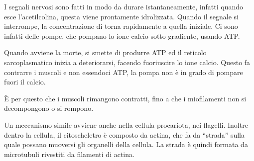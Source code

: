 I segnali nervosi sono fatti in modo da durare istantaneamente, infatti quando esce l'acetilcolina, questa viene prontamente idrolizzata. Quando il segnale si interrompe, la concentrazione di  torna rapidamente a quella iniziale. Ci sono infatti delle pompe, che pompano lo ione calcio sotto gradiente, usando ATP.{}

Quando avviene la morte, si smette di produrre ATP ed il reticolo sarcoplasmatico inizia a deteriorarsi, facendo fuoriuscire lo ione calcio. Questo fa contrarre i muscoli e non essendoci ATP, la pompa non è in grado di pompare fuori il calcio.

È per questo che i muscoli rimangono contratti, fino a che i miofilamenti non si decompongono o si rompono.

Un meccanismo simile avviene anche nella cellula procariota, nei flagelli. Inoltre dentro la cellula, il citoscheletro è composto da actina, che fa da ``strada'' sulla quale possano muoversi gli organelli della cellula. La strada è quindi formata da microtubuli rivestiti da filamenti di actina.


\begingroup {} \endgroup